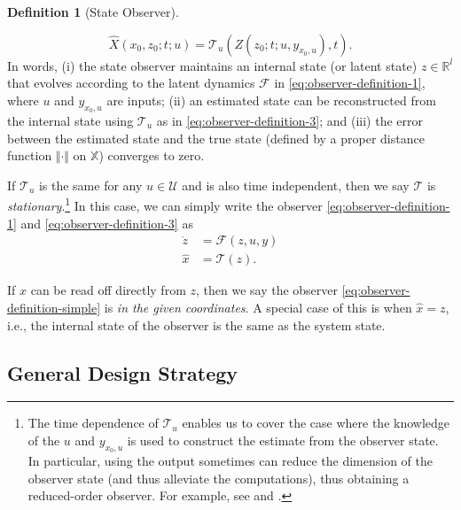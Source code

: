 \documentclass[
]{book}
\theoremstyle{definition}
\newtheorem{definition}{Definition}[chapter]
\theoremstyle{definition}
\theoremstyle{definition}
\theoremstyle{definition}
\theoremstyle{remark}
\begin{document}
\begin{definition}[State Observer]
\begin{enumerate}
\begin{equation}
  \hat{X}(x_0,z_0;t;u) = \mathcal{T}_u(Z(z_0;t;u,y_{x_0,u}),t).
  \label{eq:observer-definition-3}
  \end{equation}
  In words, (i) the state observer maintains an internal state (or latent state) \(z \in \mathbb{R}^l\) that evolves according to the latent dynamics \(\mathcal{F}\) in \eqref{eq:observer-definition-1}, where \(u\) and \(y_{x_0,u}\) are inputs; (ii) an estimated state can be reconstructed from the internal state using \(\mathcal{T}_u\) as in \eqref{eq:observer-definition-3}; and (iii) the error between the estimated state and the true state (defined by a proper distance function \(\Vert \cdot \Vert\) on \(\mathbb{X}\)) converges to zero.
\end{enumerate}

If \(\mathcal{T}_u\) is the same for any \(u \in \mathcal{U}\) and is also time independent, then we say \(\mathcal{T}\) is \emph{stationary}.\footnote{The time dependence of \(\mathcal{T}_u\) enables us to cover the case where the knowledge of the \(u\) and \(y_{x_0,u}\) is used to construct the estimate from the observer state. In particular, using the output sometimes can reduce the dimension of the observer state (and thus alleviate the computations), thus obtaining a reduced-order observer. For example, see \citep{karagiannis05cdc-nonlinear} and \citep{astolfi03tac-immersion}.} In this case, we can simply write the observer \eqref{eq:observer-definition-1} and \eqref{eq:observer-definition-3} as
\begin{equation}
\begin{split}
\dot{z} &= \mathcal{F}(z,u,y) \\
\hat{x} &= \mathcal{T}(z).
\end{split}
\label{eq:observer-definition-simple}
\end{equation}

If \(\hat{x}\) can be read off directly from \(z\), then we say the observer \eqref{eq:observer-definition-simple} is \emph{in the given coordinates}. A special case of this is when \(\hat{x} = z\), i.e., the internal state of the observer is the same as the system state.
\end{definition}

\hypertarget{general-design-strategy}{%
\subsection{General Design Strategy}\label{general-design-strategy}}
\end{document}

